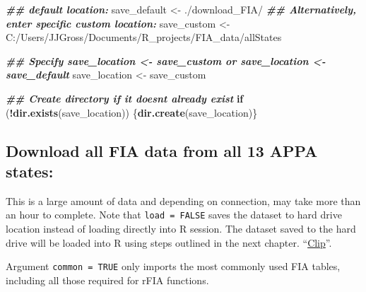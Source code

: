 \documentclass[
]{book}
\newenvironment{Shaded}{\begin{snugshade}}{\end{snugshade}}
\newcommand{\ControlFlowTok}[1]{\textcolor[rgb]{0.13,0.29,0.53}{\textbf{#1}}}
\newcommand{\DocumentationTok}[1]{\textcolor[rgb]{0.56,0.35,0.01}{\textbf{\textit{#1}}}}
\newcommand{\FunctionTok}[1]{\textcolor[rgb]{0.13,0.29,0.53}{\textbf{#1}}}
\newcommand{\NormalTok}[1]{#1}
\newcommand{\OtherTok}[1]{\textcolor[rgb]{0.56,0.35,0.01}{#1}}
\newcommand{\SpecialCharTok}[1]{\textcolor[rgb]{0.81,0.36,0.00}{\textbf{#1}}}
\newcommand{\StringTok}[1]{\textcolor[rgb]{0.31,0.60,0.02}{#1}}
\begin{document}
\begin{Shaded}
\begin{Highlighting}[]
\DocumentationTok{\#\# default location:}
\NormalTok{save\_default }\OtherTok{\textless{}{-}} \StringTok{\textquotesingle{}./download\_FIA/\textquotesingle{}} 
\DocumentationTok{\#\# Alternatively, enter specific custom location:}
\NormalTok{save\_custom }\OtherTok{\textless{}{-}} \StringTok{\textquotesingle{}C:/Users/JJGross/Documents/R\_projects/FIA\_data/allStates\textquotesingle{}}

\DocumentationTok{\#\# Specify \textasciigrave{}save\_location \textless{}{-} save\_custom\textasciigrave{} or \textasciigrave{}save\_location \textless{}{-} save\_default\textasciigrave{}}
\NormalTok{save\_location }\OtherTok{\textless{}{-}}\NormalTok{ save\_custom}

\DocumentationTok{\#\# Create directory if it doesn\textquotesingle{}t already exist}
\ControlFlowTok{if}\NormalTok{ (}\SpecialCharTok{!}\FunctionTok{dir.exists}\NormalTok{(save\_location)) \{}\FunctionTok{dir.create}\NormalTok{(save\_location)\}}
\end{Highlighting}
\end{Shaded}

\hypertarget{download-all-fia-data-from-all-13-appa-states}{%
\subsection{Download all FIA data from all 13 APPA states:}\label{download-all-fia-data-from-all-13-appa-states}}

This is a large amount of data and depending on connection, may take more than an hour to complete. Note that \texttt{load\ =\ FALSE} saves the dataset to hard drive location instead of loading directly into R session. The dataset saved to the hard drive will be loaded into R using steps outlined in the next chapter. ``\protect\hyperlink{clip}{Clip}''.

Argument \texttt{common\ =\ TRUE} only imports the most commonly used FIA tables, including all those required for rFIA functions.
\end{document}
